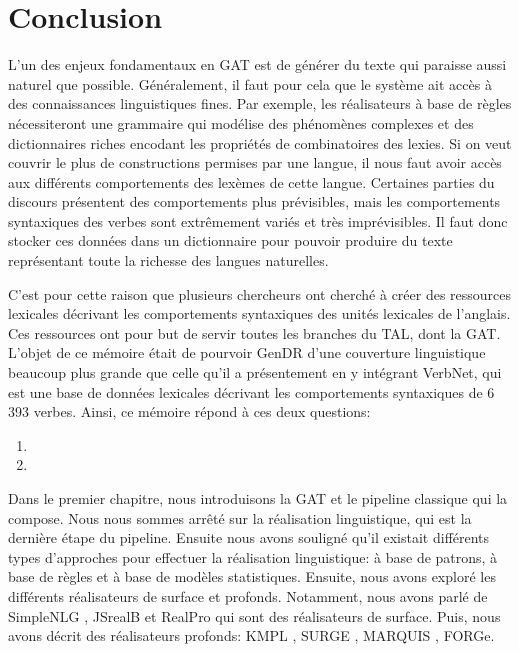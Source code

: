 
\chapter*{Conclusion}
L'un des enjeux fondamentaux en \ac{GAT} est de générer du texte qui paraisse aussi naturel que possible. Généralement, il faut pour cela que le système ait accès à des connaissances linguistiques fines. Par exemple, les réalisateurs à base de règles nécessiteront une grammaire qui modélise des phénomènes complexes et des dictionnaires riches encodant les propriétés de combinatoires des lexies. Si on veut couvrir le plus de constructions permises par une langue, il nous faut avoir accès aux différents comportements des lexèmes de cette langue. Certaines parties du discours présentent des comportements plus prévisibles, mais les comportements syntaxiques des verbes sont extrêmement variés et très imprévisibles. Il faut donc stocker ces données dans un dictionnaire pour pouvoir produire du texte représentant toute la richesse des langues naturelles.

C'est pour cette raison que plusieurs chercheurs ont cherché à créer des ressources lexicales décrivant les comportements syntaxiques des unités lexicales de l'anglais. Ces ressources ont pour but de servir toutes les branches du \ac{TAL}, dont la \ac{GAT}. L'objet de ce mémoire était de pourvoir GenDR d'une couverture linguistique beaucoup plus grande que celle qu'il a présentement en y intégrant VerbNet, qui est une base de données lexicales décrivant les comportements syntaxiques de 6\,393 verbes. Ainsi, ce mémoire répond à ces deux questions:

\begin{enumerate}
  \item {}
  \item {}
\end{enumerate}

Dans le premier chapitre, nous introduisons la \ac{GAT} et le pipeline classique qui la compose. Nous nous sommes arrêté sur la réalisation linguistique, qui est la dernière étape du pipeline. Ensuite nous avons souligné qu'il existait différents types d'approches pour effectuer la réalisation linguistique: à base de patrons, à base de règles et à base de modèles statistiques. Ensuite, nous avons exploré les différents réalisateurs de surface et profonds. Notamment, nous avons parlé de SimpleNLG \citep{GattSimpleNLGRealisationEngine2009}, JSrealB \citep{MolinsJSrealBBilingualText2015} et RealPro \citep{LavoieFastPortableRealizer1997} qui sont des réalisateurs de surface. Puis, nous avons décrit des réalisateurs profonds: KMPL \cite{BatemanEnablingTechnologyMultilingual1997}, SURGE \citep{Elhadad98surge:a}, MARQUIS \citep{WannerMARQUISGENERATIONUSERTAILORED2010}, FORGe\citep{MilledemoFORGePompeu2017}.

